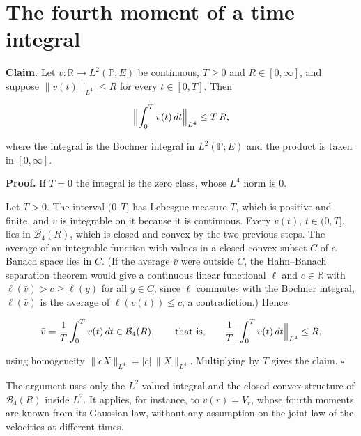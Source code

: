 \documentclass[11pt,a4paper]{article}
\begin{document}
\section{\texorpdfstring{The fourth moment of a time integral}{The fourth moment of a time integral}}


\textbf{Claim.} Let \(v:\mathbb R\to L^2(\mathbb P;E)\) be continuous, \(T\ge0\) and \(R\in[0,\infty]\), and suppose \(\|v(t)\|_{L^4}\le R\) for every \(t\in[0,T]\). Then


\[\Bigl\|\int_0^Tv(t)\,dt\Bigr\|_{L^4}\le T\,R,\]


where the integral is the Bochner integral in \(L^2(\mathbb P;E)\) and the product is taken in \([0,\infty]\).




\textbf{Proof.} If \(T=0\) the integral is the zero class, whose \(L^4\) norm is \(0\).




Let \(T>0\). The interval \((0,T]\) has Lebesgue measure \(T\), which is positive and finite, and \(v\) is integrable on it because it is continuous. Every \(v(t)\), \(t\in(0,T]\), lies in \(\mathcal B_4(R)\), which is closed and convex by the two previous steps. The average of an integrable function with values in a closed convex subset \(C\) of a Banach space lies in \(C\). (If the average \(\bar v\) were outside \(C\), the Hahn–Banach separation theorem would give a continuous linear functional \(\ell\) and \(c\in\mathbb R\) with \(\ell(\bar v)>c\ge\ell(y)\) for all \(y\in C\); since \(\ell\) commutes with the Bochner integral, \(\ell(\bar v)\) is the average of \(\ell(v(t))\le c\), a contradiction.) Hence


\[\bar v=\frac1T\int_0^Tv(t)\,dt\in\mathcal B_4(R),\qquad\text{that is,}\qquad\frac1T\Bigl\|\int_0^Tv(t)\,dt\Bigr\|_{L^4}\le R,\]


using homogeneity \(\|cX\|_{L^4}=|c|\,\|X\|_{L^4}\). Multiplying by \(T\) gives the claim. \(\square\)




The argument uses only the \(L^2\)-valued integral and the closed convex structure of \(\mathcal B_4(R)\) inside \(L^2\). It applies, for instance, to \(v(r)=V_r\), whose fourth moments are known from its Gaussian law, without any assumption on the joint law of the velocities at different times.
\end{document}
